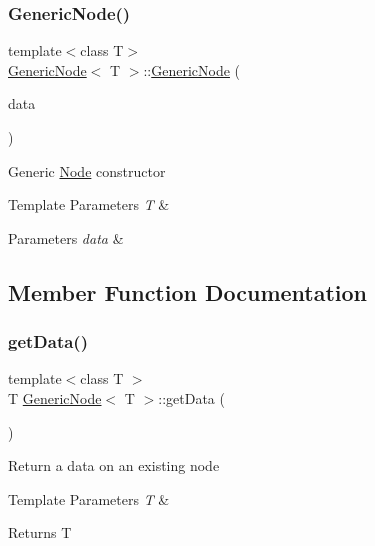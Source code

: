 \subsubsection{\texorpdfstring{GenericNode()}{GenericNode()}}
{\footnotesize\ttfamily template$<$class T$>$ \\
\mbox{\hyperlink{class_generic_node}{Generic\+Node}}$<$ T $>$\+::\mbox{\hyperlink{class_generic_node}{Generic\+Node}} (\begin{DoxyParamCaption}\item[{T}]{data }\end{DoxyParamCaption})}

Generic \mbox{\hyperlink{class_node}{Node}} constructor 
\begin{DoxyTemplParams}{Template Parameters}
{\em T} & \\
\hline
\end{DoxyTemplParams}

\begin{DoxyParams}{Parameters}
{\em data} & \\
\hline
\end{DoxyParams}


\subsection{Member Function Documentation}
\mbox{\label{class_generic_node_a77f64973b12b7c7e2b6707e0b9e9a464}} 
\subsubsection{\texorpdfstring{getData()}{getData()}}
{\footnotesize\ttfamily template$<$class T $>$ \\
T \mbox{\hyperlink{class_generic_node}{Generic\+Node}}$<$ T $>$\+::get\+Data (\begin{DoxyParamCaption}{ }\end{DoxyParamCaption})}

Return a data on an existing node 
\begin{DoxyTemplParams}{Template Parameters}
{\em T} & \\
\hline
\end{DoxyTemplParams}
\begin{DoxyReturn}{Returns}
T 
\end{DoxyReturn}
\mbox{\label{class_generic_node_a0e6e224f6c52b0bf9e09264185e4976a}} 
